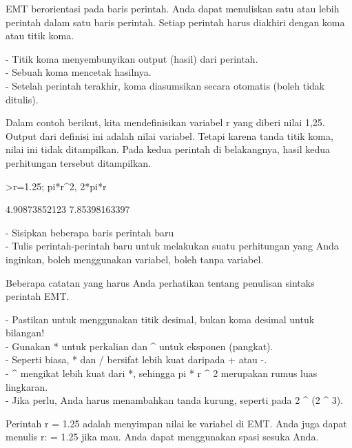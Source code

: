 \documentclass[a4paper,10pt]{article}
\begin{document}
\begin{eulernotebook}
\begin{eulercomment}
\begin{eulercomment}
\begin{eulercomment}
EMT berorientasi pada baris perintah. Anda dapat menuliskan satu atau lebih
perintah dalam satu baris perintah. Setiap perintah harus diakhiri dengan koma
atau titik koma.

- Titik koma menyembunyikan output (hasil) dari perintah.\\
- Sebuah koma mencetak hasilnya.\\
- Setelah perintah terakhir, koma diasumsikan secara otomatis (boleh tidak
ditulis).

Dalam contoh berikut, kita mendefinisikan variabel r yang diberi nilai 1,25.
Output dari definisi ini adalah nilai variabel. Tetapi karena tanda titik koma,
nilai ini tidak ditampilkan. Pada kedua perintah di belakangnya, hasil kedua
perhitungan tersebut ditampilkan.
\end{eulercomment}
\begin{eulerprompt}
>r=1.25; pi*r^2, 2*pi*r 
\end{eulerprompt}
\begin{euleroutput}
  4.90873852123
  7.85398163397
\end{euleroutput}
\begin{eulercomment}
- Sisipkan beberapa baris perintah baru\\
- Tulis perintah-perintah baru untuk melakukan suatu perhitungan yang Anda
inginkan, boleh menggunakan variabel, boleh tanpa variabel.\\
\end{eulercomment}
\eulersubheading{}
\begin{eulercomment}
Beberapa catatan yang harus Anda perhatikan tentang penulisan sintaks perintah
EMT.

- Pastikan untuk menggunakan titik desimal, bukan koma desimal untuk bilangan!\\
- Gunakan * untuk perkalian dan \textasciicircum{} untuk eksponen (pangkat).\\
- Seperti biasa, * dan / bersifat lebih kuat daripada + atau -.\\
- \textasciicircum{} mengikat lebih kuat dari *, sehingga pi * r \textasciicircum{} 2 merupakan rumus luas
lingkaran.\\
- Jika perlu, Anda harus menambahkan tanda kurung, seperti pada 2 \textasciicircum{} (2 \textasciicircum{} 3).

Perintah r = 1.25 adalah menyimpan nilai ke variabel di EMT. Anda juga dapat
menulis r: = 1.25 jika mau. Anda dapat menggunakan spasi sesuka Anda.


\end{eulercomment}
\end{eulercomment}
\end{eulercomment}
\end{eulernotebook}
\end{document}
